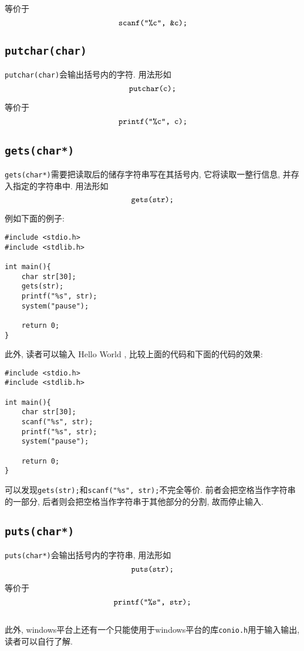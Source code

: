            等价于
                \[ \mbox{\texttt{scanf("\%c", \&c);}} \]  

        \subsection*{\texttt{putchar(char)}}
            \texttt{putchar(char)}会输出括号内的字符. 用法形如
                \[ \mbox{\texttt{putchar(c);}} \]

            等价于
                \[ \mbox{\texttt{printf("\%c", c);}} \]

        \subsection*{\texttt{gets(char*)}}
            \texttt{gets(char*)}需要把读取后的储存字符串写在其括号内, 它将读取一整行信息, 并存入指定的字符串中. 用法形如
                \[ \mbox{\texttt{gets(str);}} \]

            例如下面的例子:
\begin{lstlisting}
#include <stdio.h>
#include <stdlib.h>

int main(){
    char str[30];
    gets(str);
    printf("%s", str);
    system("pause");

    return 0;
}
\end{lstlisting}

            此外, 读者可以输入 Hello World , 比较上面的代码和下面的代码的效果:
\begin{lstlisting}
#include <stdio.h>
#include <stdlib.h>

int main(){
    char str[30];
    scanf("%s", str);
    printf("%s", str);
    system("pause");

    return 0;
}
\end{lstlisting}

            可以发现\texttt{gets(str);}和\texttt{scanf("\%s", str);}不完全等价. 前者会把空格当作字符串的一部分, 后者则会把空格当作字符串于其他部分的分割, 故而停止输入.

        \subsection*{\texttt{puts(char*)}}
            \texttt{puts(char*)}会输出括号内的字符串, 用法形如
                \[ \mbox{\texttt{puts(str);}} \]

            等价于
                \[ \mbox{\texttt{printf("\%s", str);}} \]

        \subsection*{ }
        此外, windows平台上还有一个只能使用于windows平台的库\texttt{conio.h}用于输入输出, 读者可以自行了解.